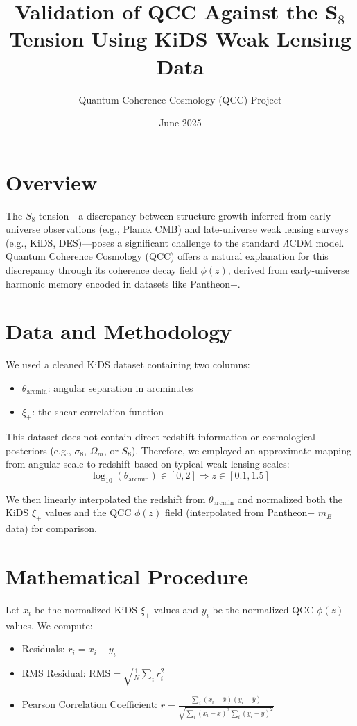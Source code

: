 \documentclass{article}
\title{Validation of QCC Against the S$_8$ Tension Using KiDS Weak Lensing Data}
\author{Quantum Coherence Cosmology (QCC) Project}
\date{June 2025}
\begin{document}
\maketitle

\section*{Overview}
The $S_8$ tension---a discrepancy between structure growth inferred from early-universe observations (e.g., Planck CMB) and late-universe weak lensing surveys (e.g., KiDS, DES)---poses a significant challenge to the standard $\Lambda$CDM model. Quantum Coherence Cosmology (QCC) offers a natural explanation for this discrepancy through its coherence decay field $\phi(z)$, derived from early-universe harmonic memory encoded in datasets like Pantheon+.

\section*{Data and Methodology}
We used a cleaned KiDS dataset containing two columns:
\begin{itemize}
  \item $\theta_{\mathrm{arcmin}}$: angular separation in arcminutes
  \item $\xi_+$: the shear correlation function
\end{itemize}
This dataset does not contain direct redshift information or cosmological posteriors (e.g., $\sigma_8$, $\Omega_m$, or $S_8$). Therefore, we employed an approximate mapping from angular scale to redshift based on typical weak lensing scales:
\begin{equation}
  \log_{10}(\theta_{\mathrm{arcmin}}) \in [0, 2] \Rightarrow z \in [0.1, 1.5]
\end{equation}

We then linearly interpolated the redshift from $\theta_{\mathrm{arcmin}}$ and normalized both the KiDS $\xi_+$ values and the QCC $\phi(z)$ field (interpolated from Pantheon+ $m_B$ data) for comparison.

\section*{Mathematical Procedure}
Let $x_i$ be the normalized KiDS $\xi_+$ values and $y_i$ be the normalized QCC $\phi(z)$ values. We compute:
\begin{itemize}
  \item Residuals: $r_i = x_i - y_i$
  \item RMS Residual: $\text{RMS} = \sqrt{\frac{1}{N} \sum_i r_i^2}$
  \item Pearson Correlation Coefficient: $r = \frac{\sum_i (x_i - \bar{x})(y_i - \bar{y})}{\sqrt{\sum_i (x_i - \bar{x})^2 \sum_i (y_i - \bar{y})^2}}$
\end{itemize}
\end{document}
